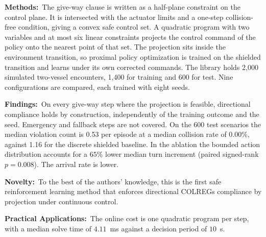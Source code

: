 \documentclass[10pt,letterpaper]{article}
\newcommand{\abshead}[1]{\textbf{#1}\ }
\begin{document}
\abshead{Methods:}The give-way clause is written as a half-plane constraint on the control plane. It is intersected with the actuator limits and a one-step collision-free condition,
giving a convex safe control set. A quadratic program with two variables and at most six linear constraints projects the
control command of the policy onto the nearest point of that set. The projection sits inside the environment transition, so proximal policy optimization
is trained on the shielded transition and learns under its own corrected commands. The library holds 2,000 simulated two-vessel encounters, 1,400 for training and 600 for
test. Nine configurations are compared, each trained with eight seeds.

\abshead{Findings:}On every give-way step where the projection is feasible, directional compliance holds by
construction, independently of the training outcome and the seed. Emergency and fallback steps are not covered. On the 600 test scenarios the median violation count is 0.53 per episode at a median
collision rate of 0.00\%, against 1.16 for the discrete shielded baseline. In the ablation the bounded action distribution accounts for a $65\%$ lower median turn
increment (paired signed-rank $p=0.008$). The arrival rate is lower.

\abshead{Novelty:}To the best of the authors' knowledge, this is the first safe reinforcement learning
method that enforces directional COLREGs compliance by projection under continuous
control. 

\abshead{Practical Applications:}The online cost is one quadratic program per step,
with a median solve time of $4.11$~ms against a decision period of $10$~s.

\vspace{12pt}

\endgroup


\newpage
\end{document}
